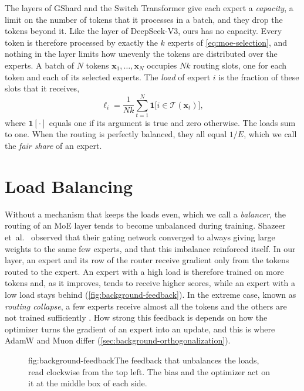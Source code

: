 The layers of GShard and the Switch Transformer \cite{lepikhin2021gshard, fedus2022switch} give each expert a \emph{capacity}, a limit on the number of tokens that it processes in a batch, and they drop the tokens beyond it. Like the layer of DeepSeek-V3, ours has no capacity. Every token is therefore processed by exactly the $k$ experts of \cref{eq:moe-selection}, and nothing in the layer limits how unevenly the tokens are distributed over the experts. A batch of $N$ tokens $\mathbf{x}_1, \dots, \mathbf{x}_N$ occupies $Nk$ routing slots, one for each token and each of its selected experts. The \emph{load} of expert $i$ is the fraction of these slots that it receives,
\begin{equation}[eq:moe-load]{}
  \ell_i = \frac{1}{Nk} \sum_{t=1}^{N} \mathbf{1}\bigl[ i \in \mathcal{T}(\mathbf{x}_t) \bigr],
\end{equation}
where $\mathbf{1}[\cdot]$ equals one if its argument is true and zero otherwise. The loads sum to one. When the routing is perfectly balanced, they all equal $1/E$, which we call the \emph{fair share} of an expert.

\section{Load Balancing}
\label{sec:background-balancing}
\label{sec:background-feedback}
Without a mechanism that keeps the loads even, which we call a \emph{balancer}, the routing of an MoE layer tends to become unbalanced during training. Shazeer et~al.~\cite{shazeer2017outrageously} observed that their gating network converged to always giving large weights to the same few experts, and that this imbalance reinforced itself. In our layer, an expert and its row of the router receive gradient only from the tokens routed to the expert. An expert with a high load is therefore trained on more tokens and, as it improves, tends to receive higher scores, while an expert with a low load stays behind (\cref{fig:background-feedback}). In the extreme case, known as \emph{routing collapse}, a few experts receive almost all the tokens and the others are not trained sufficiently \cite{dai2024deepseekmoe, wang2024lossfree}. How strong this feedback is depends on how the optimizer turns the gradient of an expert into an update, and this is where AdamW and Muon differ (\cref{sec:background-orthogonalization}).

\begin{figure}[The feedback that unbalances the loads]{fig:background-feedback}{The feedback that unbalances the loads, read clockwise from the top left. The bias and the optimizer act on it at the middle box of each side.}
  
\end{figure}

